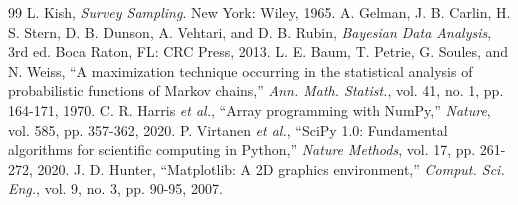 \documentclass[conference]{IEEEtran}
\begin{document}
\begin{thebibliography}{99}
 L. Kish, \emph{Survey Sampling}. New York: Wiley, 1965.
 A. Gelman, J. B. Carlin, H. S. Stern, D. B. Dunson, A. Vehtari, and D. B. Rubin, \emph{Bayesian Data Analysis}, 3rd ed. Boca Raton, FL: CRC Press, 2013.
 L. E. Baum, T. Petrie, G. Soules, and N. Weiss, ``A maximization technique occurring in the statistical analysis of probabilistic functions of Markov chains,'' \emph{Ann. Math. Statist.}, vol. 41, no. 1, pp. 164-171, 1970.
 C. R. Harris \emph{et al.}, ``Array programming with NumPy,'' \emph{Nature}, vol. 585, pp. 357-362, 2020.
 P. Virtanen \emph{et al.}, ``SciPy 1.0: Fundamental algorithms for scientific computing in Python,'' \emph{Nature Methods}, vol. 17, pp. 261-272, 2020.
 J. D. Hunter, ``Matplotlib: A 2D graphics environment,'' \emph{Comput. Sci. Eng.}, vol. 9, no. 3, pp. 90-95, 2007.
\end{thebibliography}
\end{document}
